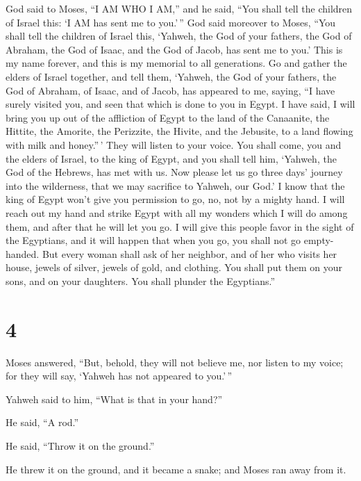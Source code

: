  God said to Moses, ``I AM WHO I AM,'' and he said, ``You
shall tell the children of Israel this: `I AM has sent me to you.'\,''
 God said moreover to Moses, ``You shall tell the
children of Israel this, `Yahweh, the God of your fathers, the God of
Abraham, the God of Isaac, and the God of Jacob, has sent me to you.'
This is my name forever, and this is my memorial to all generations.
 Go and gather the elders of Israel together, and tell
them, `Yahweh, the God of your fathers, the God of Abraham, of Isaac,
and of Jacob, has appeared to me, saying, ``I have surely visited you,
and seen that which is done to you in Egypt.  I have
said, I will bring you up out of the affliction of Egypt to the land of
the Canaanite, the Hittite, the Amorite, the Perizzite, the Hivite, and
the Jebusite, to a land flowing with milk and honey.''\,'
 They will listen to your voice. You shall come, you and
the elders of Israel, to the king of Egypt, and you shall tell him,
`Yahweh, the God of the Hebrews, has met with us. Now please let us go
three days' journey into the wilderness, that we may sacrifice to
Yahweh, our God.'  I know that the king of Egypt won't
give you permission to go, no, not by a mighty hand.  I
will reach out my hand and strike Egypt with all my wonders which I will
do among them, and after that he will let you go.  I will
give this people favor in the sight of the Egyptians, and it will happen
that when you go, you shall not go empty-handed.  But
every woman shall ask of her neighbor, and of her who visits her house,
jewels of silver, jewels of gold, and clothing. You shall put them on
your sons, and on your daughters. You shall plunder the Egyptians.''

\hypertarget{section-3}{%
\section{4}\label{section-3}}

 Moses answered, ``But, behold, they will not believe me,
nor listen to my voice; for they will say, `Yahweh has not appeared to
you.'\,''

 Yahweh said to him, ``What is that in your hand?''

He said, ``A rod.''

 He said, ``Throw it on the ground.''

He threw it on the ground, and it became a snake; and Moses ran away
from it.

